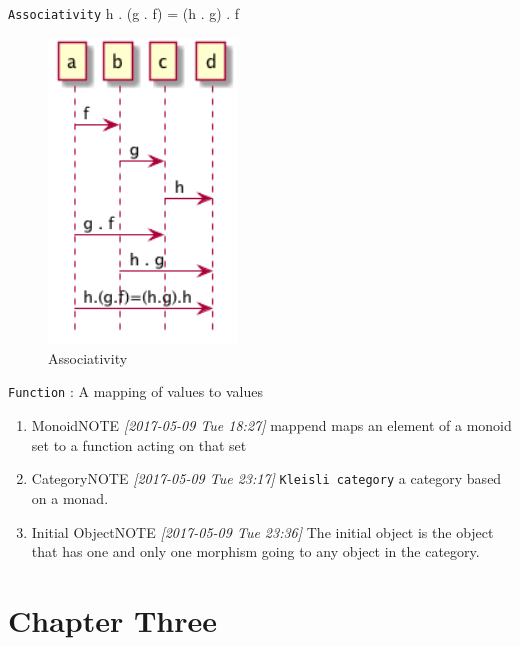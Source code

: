 \documentclass[12pt]{scrartcl}
\begin{document}
\texttt{Associativity}
h . (g . f) = (h . g) . f
\begin{figure}[htbp]
\caption{\label{fig:org778a035}
Associativity}
\centering
\includegraphics[width=5cm]{img/Associativity.png}
\end{figure}

\texttt{Function} :  A mapping of values to values

\begin{enumerate}
\item Monoid\hfill{}\textsc{NOTE}
\label{sec:org396ecf0}
\textit{[2017-05-09 Tue 18:27]}
mappend maps an element of a monoid set to a function acting on that set

\item Category\hfill{}\textsc{NOTE}
\label{sec:orgae611ff}
\textit{[2017-05-09 Tue 23:17]}
\texttt{Kleisli category}  a category based on a monad.
\item Initial Object\hfill{}\textsc{NOTE}
\label{sec:org0502608}
\textit{[2017-05-09 Tue 23:36]}
The initial object is the object that has one and only one morphism going to any object in the category.

\newpage
\end{enumerate}
\section{Chapter Three}
\label{sec:org3c21cce}
\end{document}
